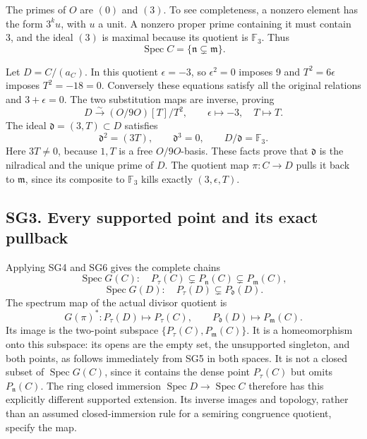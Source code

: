 \documentclass[
  10pt,
  a4paper,
]{article}
\begin{document}
The primes of \(O\) are \((0)\) and \((3)\). To see completeness, a
nonzero element has the form \(3^k u\), with \(u\) a unit. A nonzero
proper prime containing it must contain 3, and the ideal \((3)\) is
maximal because its quotient is \(\mathbb F_3\). Thus \[
\operatorname{Spec}C=\{\mathfrak n\subsetneq\mathfrak m\}.
\tag{SG10}
\]

Let \(D=C/(a_C)\). In this quotient \(\epsilon=-3\), so \(\epsilon^2=0\)
imposes 9 and \(T^2=6\epsilon\) imposes \(T^2=-18=0\). Conversely these
equations satisfy all the original relations and \(3+\epsilon=0\). The
two substitution maps are inverse, proving \[
D\xrightarrow{\sim}(O/9O)[T]/T^2,\qquad
\epsilon\mapsto-3,\quad T\mapsto T.
\tag{SG11}
\] The ideal \(\mathfrak d=(3,T)\subset D\) satisfies \[
\mathfrak d^2=(3T),\qquad \mathfrak d^3=0,\qquad
D/\mathfrak d=\mathbb F_3.
\tag{SG12}
\] Here \(3T\ne0\), because \(1,T\) is a free \(O/9O\)-basis. These
facts prove that \(\mathfrak d\) is the nilradical and the unique prime
of \(D\). The quotient map \(\pi:C\to D\) pulls it back to
\(\mathfrak m\), since its composite to \(\mathbb F_3\) kills exactly
\((3,\epsilon,T)\).

\subsection{SG3. Every supported point and its exact
pullback}\label{sg3.-every-supported-point-and-its-exact-pullback}

Applying SG4 and SG6 gives the complete chains \[
\operatorname{Spec}G(C):\quad
P_\tau(C)\subsetneq P_{\mathfrak n}(C)\subsetneq P_{\mathfrak m}(C),
\] \[
\operatorname{Spec}G(D):\quad
P_\tau(D)\subsetneq P_{\mathfrak d}(D).
\tag{SG13}
\] The spectrum map of the actual divisor quotient is \[
G(\pi)^*:P_\tau(D)\mapsto P_\tau(C),\qquad
P_{\mathfrak d}(D)\mapsto P_{\mathfrak m}(C).
\tag{SG14}
\] Its image is the two-point subspace
\(\{P_\tau(C),P_{\mathfrak m}(C)\}\). It is a homeomorphism onto this
subspace: its opens are the empty set, the unsupported singleton, and
both points, as follows immediately from SG5 in both spaces. It is not a
closed subset of \(\operatorname{Spec}G(C)\), since it contains the
dense point \(P_\tau(C)\) but omits \(P_{\mathfrak n}(C)\). The ring
closed immersion \(\operatorname{Spec}D\to\operatorname{Spec}C\)
therefore has this explicitly different supported extension. Its inverse
images and topology, rather than an assumed closed-immersion rule for a
semiring congruence quotient, specify the map.
\end{document}
